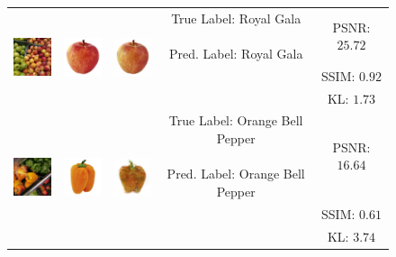 \begin{figure}[t]
\begin{tabular}{c c c c c}
         \multirow{3}{*}{\includegraphics[width=15mm, height=15mm]{figures_and_tables/decoded_iconic_images/Royal-Gala_055.jpg}} & \multirow{3}{*}{\includegraphics[width=15mm, height=15mm]{figures_and_tables/iconic_image_figures/Royal-Gala-Apple_Clean.jpg}} & \multirow{3}{*}{\includegraphics[width=15mm, height=15mm]{figures_and_tables/decoded_iconic_images/vcca_xiwy/royal_gala_image266.png}} & \multirowcell{3}{True Label: Royal Gala\\ \\ Pred. Label: Royal Gala} & PSNR: $25.72$ \\
         & & & & SSIM: $0.92$ \\
         & & & & KL: $1.73$ \\

         \multirow{3}{*}{\includegraphics[width=15mm, height=15mm]{figures_and_tables/decoded_iconic_images/Orange-Bell-Pepper_008.jpg}} & \multirow{3}{*}{\includegraphics[width=15mm, height=15mm]{figures_and_tables/iconic_image_figures/Orange-Bell-Pepper_Iconic.jpg}} & \multirow{3}{*}{\includegraphics[width=15mm, height=15mm]{figures_and_tables/decoded_iconic_images/vcca_xiwy/orange_bell_pepper_image2191.png}} & \multirowcell{3}{True Label: Orange Bell Pepper\\ \\ Pred. Label: Orange Bell Pepper} & PSNR: $16.64$ \\
         & & & & SSIM: $0.61$ \\
         & & & & KL: $3.74$ \\


\end{tabular}
\end{figure}

